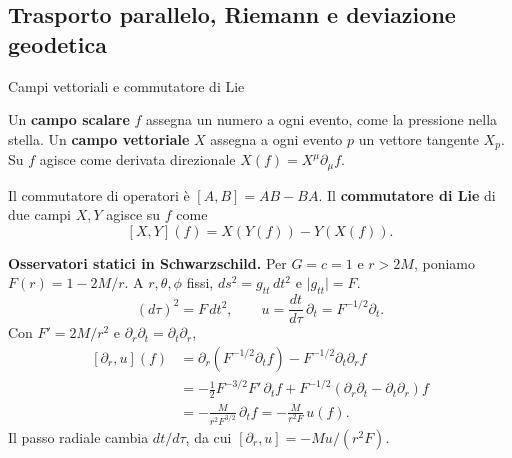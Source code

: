 \subsection{Trasporto parallelo, Riemann e deviazione geodetica} 

\begin{frame}[t]{Campi vettoriali e commutatore di Lie}
\small\raggedright

Un \textbf{campo scalare} \(f\) assegna un numero a ogni evento,
come la pressione nella stella. Un \textbf{campo vettoriale} \(X\)
assegna a ogni evento \(p\) un vettore tangente \(X_p\).
Su \(f\) agisce come derivata direzionale \(X(f)=X^\mu\partial_\mu f\).

\medskip
Il commutatore di operatori è \([A,B]=AB-BA\).
Il \textbf{commutatore di Lie} di due campi \(X,Y\) agisce su \(f\) come
\[
[X,Y](f)=X(Y(f))-Y(X(f)).
\]

\textbf{Osservatori statici in Schwarzschild.}
Per \(G=c=1\) e \(r>2M\), poniamo \(F(r)=1-2M/r\).
A \(r,\theta,\phi\) fissi, \(ds^2=g_{tt}\,dt^2\) e \(\lvert g_{tt}\rvert=F\).
\[
(d\tau)^2=F\,dt^2,\qquad
u=\frac{dt}{d\tau}\,\partial_t=F^{-1/2}\partial_t.
\]
Con \(F'=2M/r^2\) e \(\partial_r\partial_t=\partial_t\partial_r\),
\[
\begin{aligned}
[\partial_r,u](f)
&=\partial_r(F^{-1/2}\partial_t f)
  -F^{-1/2}\partial_t\partial_r f\\
&=-\tfrac12 F^{-3/2}F'\,\partial_t f
  +F^{-1/2}(\partial_r\partial_t-\partial_t\partial_r)f\\
&=-\tfrac{M}{r^2F^{3/2}}\,\partial_t f
  =-\tfrac{M}{r^2F}\,u(f).
\end{aligned}
\]
Il passo radiale cambia \(dt/d\tau\), da cui
\([\partial_r,u]=-M u/(r^2F)\).
\end{frame}

